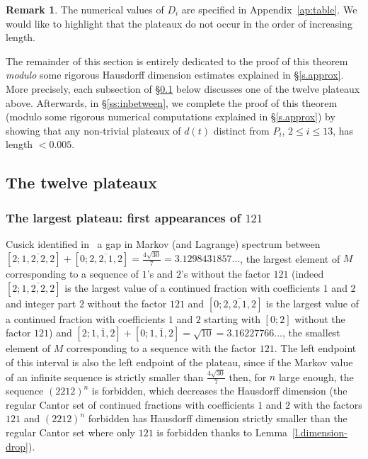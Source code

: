 \documentclass[10pt]{amsart}
\numberwithin{equation}{section}
\theoremstyle{definition}
\newtheorem{remark}[theorem]{Remark}
\def\leq{\leqslant }
\begin{document}

\begin{remark} 
    The numerical values of $D_i$ are specified in Appendix~\ref{ap:table}. 
    We would like to highlight that the plateaux do not occur in the order of
    increasing length.     
\end{remark}


The remainder of this section is entirely dedicated to the
proof of this theorem \emph{modulo} some rigorous Hausdorff dimension estimates explained in \S\ref{s.approx}. More precisely, each subsection of \S\ref{ss:plateaux-list} below discusses one of
the twelve plateaux above. Afterwards, in \S\ref{ss:inbetween}, we complete the
proof of this theorem (modulo some rigorous numerical computations explained in \S\ref{s.approx}) by showing that any non-trivial plateaux of $d(t)$
distinct from $P_i$, $2\leq i\leq 13$, has length $<0.005$. 

\subsection{The twelve plateaux}\label{ss:plateaux-list} 

\subsubsection{The largest plateau: first appearances of $121$} 

Cusick identified in~\cite{C74} a gap in Markov (and Lagrange) spectrum between
$[2; \overline{1,2,2,2}]+[0;
\overline{2,2,1,2}]=\frac{4\sqrt{30}}7=3.1298431857...$, the largest element of
$M$ corresponding to a sequence of $1$'s and $2$'s without the factor $121$
(indeed $[2; \overline{1,2,2,2}]$ is the largest value of a continued fraction
with coefficients $1$ and $2$ and integer part $2$ without the factor $121$ and
$[0; \overline{2,2,1,2}]$ is the largest value of a continued fraction with
coefficients $1$ and $2$ starting with $[0;2]$ without the factor $121$) and
$[2; \overline{1,1,2}]+[0;\overline{1,1,2}]=\sqrt{10}=3.16227766...$, the
smallest element of $M$ corresponding to a sequence with the factor $121$. The
left endpoint of this interval is also the left endpoint of the plateau, since
if the Markov value of an infinite sequence is strictly smaller than
$\frac{4\sqrt{30}}7$ then, for $n$ large enough, the sequence $(2212)^n$ is
forbidden, which decreases the Hausdorff dimension (the regular Cantor set of
continued fractions with coefficients $1$ and $2$ with the factors $121$ and
$(2212)^n$ forbidden has Hausdorff dimension strictly smaller than the regular
Cantor set where only $121$ is forbidden thanks to Lemma~\ref{l.dimension-drop}).  
\end{document}
